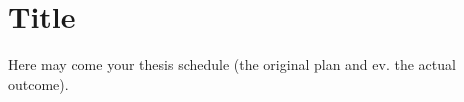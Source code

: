 \chapter{\label{timetable}Title}
Here may come your thesis schedule (the original plan and ev. the actual outcome).